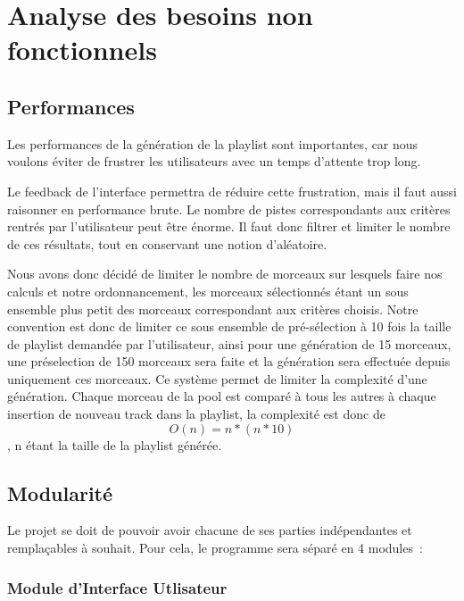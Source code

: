 \section{Analyse des besoins non fonctionnels}
\label{besoins:nfonc}

\subsection{Performances}
\label{besoins:nfonc:perf}

Les performances de la génération de la playlist sont importantes, car nous
voulons éviter de frustrer les utilisateurs avec un temps d'attente trop long.

Le feedback de l’interface permettra de réduire cette frustration, mais il faut
aussi raisonner en performance brute. Le nombre de pistes correspondants aux
critères rentrés par l’utilisateur peut être énorme. Il faut donc filtrer et
limiter le nombre de ces résultats, tout en conservant une notion d’aléatoire.

Nous avons donc décidé de limiter le nombre de morceaux sur lesquels faire nos
calculs et notre ordonnancement, les morceaux sélectionnés étant un sous ensemble
plus petit des morceaux correspondant aux critères choisis. Notre convention est
donc de limiter ce sous ensemble de pré-sélection à 10 fois la taille de playlist
demandée par l’utilisateur, ainsi pour une génération de 15 morceaux, une 
préselection de 150 morceaux sera faite et la génération sera effectuée depuis uniquement ces morceaux.
Ce système permet de limiter la complexité d'une génération. Chaque morceau de
la pool est comparé à tous les autres à chaque insertion de nouveau track dans la 
playlist, la complexité est donc de \[O(n) = n*(n*10)\], n étant la taille de la playlist générée.

\subsection{Modularité}
\label{besoins:nfonc:perf:mod}
    
Le projet se doit de pouvoir avoir chacune de ses parties indépendantes et
remplaçables à souhait. Pour cela, le programme sera séparé en 4 modules~:

\subsubsection{Module d'Interface Utlisateur}
\label{besoins:nfonc:perf:mod:iu}

